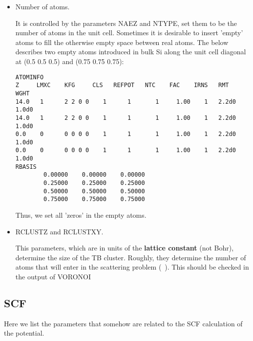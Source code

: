 \documentclass[a4paper,10pt,fullpage]{report}
\begin{document}
\begin{itemize}

\item Number of atoms. 

It is controlled by the parameters NAEZ and NTYPE, set them to be the number of atoms in the
unit cell. Sometimes it is desirable to insert 'empty' atoms to fill the otherwise empty
space between real atoms. The below describes two empty atoms introduced in bulk Si along
the unit cell diagonal at (0.5 0.5 0.5) and (0.75 0.75 0.75):
\begin{verbatim}
ATOMINFO
Z     LMXC    KFG     CLS   REFPOT   NTC    FAC    IRNS   RMT     WGHT
14.0   1      2 2 0 0    1      1       1     1.00    1   2.2d0   1.0d0
14.0   1      2 2 0 0    1      1       1     1.00    1   2.2d0   1.0d0
0.0    0      0 0 0 0    1      1       1     1.00    1   2.2d0   1.0d0
0.0    0      0 0 0 0    1      1       1     1.00    1   2.2d0   1.0d0
RBASIS
        0.00000    0.00000    0.00000
        0.25000    0.25000    0.25000
        0.50000    0.50000    0.50000
        0.75000    0.75000    0.75000
\end{verbatim} 

Thus, we set all 'zeros' in the empty atoms.

\item RCLUSTZ and RCLUSTXY.

This parameters, which are in units of the \textbf{lattice constant} (not Bohr), 
determine the size of the TB cluster. Roughly, they determine the number of atoms
that will enter in the scattering problem (~). This should be checked
in the output of VORONOI  


\end{itemize}

\subsection{SCF}

Here we list the parameters that somehow are related to the SCF calculation of the potential.
\end{document}
